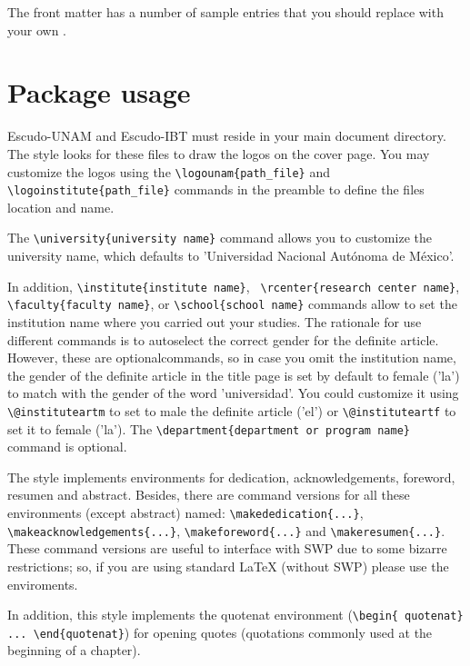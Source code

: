 \documentclass[11pt,spanish]{report}
\begin{document}
The front matter has a number of sample entries that you should replace with
your own \citep{Gottesman1984,Griffith2002,Hartwell1999}.

\section{Package usage}
Escudo-UNAM and Escudo-IBT must reside in your main document directory. The style looks
for these files to draw the logos on the cover page. You may customize the logos using
the \texttt{\textbackslash{}logounam\{path\_file\}} and
\texttt{\textbackslash{}logoinstitute\{path\_file\}} commands in the preamble to define
the files location and name.

The \texttt{\textbackslash{}university\{university name\}} command allows you to customize
the university name, which defaults to 'Universidad Nacional Aut\'{o}noma de M\'{e}xico'.

In addition, \texttt{\textbackslash{}institute\{institute name\}}, \texttt{
\textbackslash{}rcenter\{research center name\}},
\texttt{\textbackslash{}faculty\{faculty name\}}, or
\texttt{\textbackslash{}school\{school name\}} commands allow to set the institution name
where you carried out your studies. The rationale for use different commands is to
autoselect the correct gender for the definite article. However, these are optionalcommands,
so in case you omit the institution name, the gender of the definite article in the title
page is set by default to female ('la') to match with the gender of the word 'universidad'.
You could customize it using \texttt{\textbackslash{}@instituteartm} to set to male the
definite article ('el') or \texttt{\textbackslash{}@instituteartf} to set it to female
('la'). The \texttt{\textbackslash{}department\{department or program name\}} command is
optional.

The style implements environments for dedication, acknowledgements, foreword, resumen and
abstract. Besides, there are command versions for all these environments (except abstract)
named: \texttt{\textbackslash{}makededication\{...\}},
\texttt{\textbackslash{}makeacknowledgements\{...\}},
\texttt{\textbackslash{}makeforeword\{...\}} and
\texttt{\textbackslash{}makeresumen\{...\}}. These command versions are useful to interface
with SWP due to some bizarre restrictions; so, if you are using standard LaTeX (without SWP)
please use the enviroments.

In addition, this style implements the quotenat environment (\texttt{\textbackslash{}begin\{
quotenat\} ... \textbackslash{}end\{quotenat\}}) for opening quotes (quotations commonly used
at the beginning of a chapter).
\end{document}
